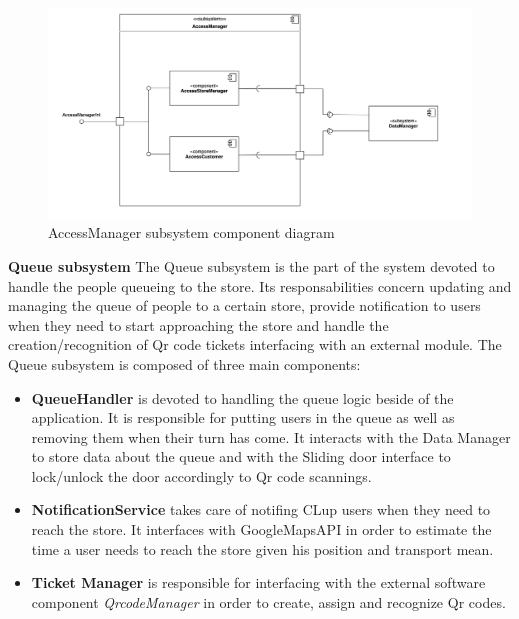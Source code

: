 \documentclass[]{article}
\begin{document}
	\bigskip
	\begin{figure}[H]
			\centering
			\includegraphics[scale=0.6]{ComponentView/AccessManagerComponent.png}
			\caption{AccessManager subsystem component diagram}
			\label{fig:AccessManagerDiagram}
		\end{figure}
		\bigskip\bigskip
	\newpage
	\noindent
	\textbf{Queue subsystem} \newline
	The Queue subsystem is the part of the system devoted to handle the people queueing to the store.
	Its responsabilities concern updating and managing the queue of people to a certain store, provide notification to users when they need to start approaching the store and handle the creation/recognition of Qr code tickets interfacing with an external module.
	The Queue subsystem is composed of three main components:
	
	\begin{itemize}
		\item 	\textbf{QueueHandler} is devoted to handling the queue logic beside of the application. It is responsible for putting users in the queue as well as removing them when their turn has come. It interacts with the Data Manager to store data about the queue and with the Sliding door interface to lock/unlock the door accordingly to Qr code scannings.
		
		\item 	\textbf{NotificationService} takes care of notifing CLup users when they need to reach the store. It interfaces with GoogleMapsAPI in order to estimate the time a user needs to reach the store given his position and transport mean.
		
		\item 	\textbf{Ticket Manager} is responsible for interfacing with the external software component \textit{QrcodeManager} in order to create, assign and recognize Qr codes.
		
	
	\end{itemize}
\end{document}
